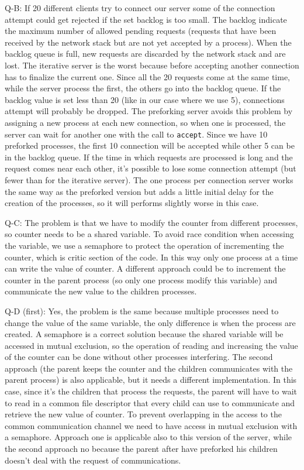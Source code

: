 Q-B: If 20 different clients try to connect our server some of the connection attempt could get rejected if the set backlog is too small. The backlog indicate the maximum number of allowed pending requests (requests that have been received by the network stack but are not yet accepted by a process). When the backlog queue is full, new requests are discarded by the network stack and are lost. The iterative server is the worst because before accepting another connection has to finalize the current one. Since all the 20 requests come at the same time, while the server process the first, the others go into the backlog queue. If the backlog value is set less than 20 (like in our case where we use 5), connections attempt will probably be dropped. The preforking server avoids this problem by assigning a new process at each new connection, so when one is processed, the server can wait for another one with the call to \texttt{accept}. Since we have 10 preforked processes, the first 10 connection will be accepted while other 5 can be in the backlog queue. If the time in which requests are processed is long and the request comes near each other, it's possible to lose some connection attempt (but fewer than for the iterative server). The one process per connection server works the same way as the preforked version but adds a little initial delay for the creation of the processes, so it will performs slightly worse in this case. \newline

Q-C: The problem is that we have to modify the counter from different processes, so counter needs to be a shared variable. To avoid race condition when accessing the variable, we use a semaphore to protect the operation of incrementing the counter, which is critic section of the code. In this way only one process at a time can write the value of counter. A different approach could be to increment the counter in the parent process (so only one process modify this variable) and communicate the new value to the children processes.\newline

Q-D (first): Yes, the problem is the same because multiple processes need to change the value of the same variable, the only difference is when the process are created. A semaphore is a correct solution because the shared variable will be accessed in mutual exclusion, so the operation of reading and increasing the value of the counter can be done without other processes interfering. The second approach (the parent keeps the counter and the children communicates with the parent process) is also applicable, but it needs a different implementation. In this case, since it's the children that process the requests, the parent will have to wait to read in a common file descriptor that every child can use to communicate and retrieve the new value of counter. To prevent overlapping in the access to the common communication channel we need to have access in mutual exclusion with a semaphore.
Approach one is applicable also to this version of the server, while the second approach no because the parent after have preforked his children doesn't deal with the request of communications. \newline


